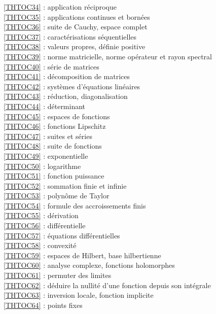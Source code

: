 \ref {THTOC34} : application réciproque\\
\ref {THTOC35} : applications continues et bornées\\
\ref {THTOC36} : suite de Cauchy, espace complet\\
\ref {THTOC37} : caractérisations séquentielles\\
\ref {THTOC38} : valeurs propres, définie positive\\
\ref {THTOC39} : norme matricielle, norme opérateur et rayon spectral\\
\ref {THTOC40} : série de matrices\\
\ref {THTOC41} : décomposition de matrices\\
\ref {THTOC42} : systèmes d'équations linéaires\\
\ref {THTOC43} : réduction, diagonalisation\\
\ref {THTOC44} : déterminant\\
\ref {THTOC45} : espaces de fonctions\\
\ref {THTOC46} : fonctions Lipschitz\\
\ref {THTOC47} : suites et séries\\
\ref {THTOC48} : suite de fonctions\\
\ref {THTOC49} : exponentielle\\
\ref {THTOC50} : logarithme\\
\ref {THTOC51} : fonction puissance\\
\ref {THTOC52} : sommation finie et infinie\\
\ref {THTOC53} : polynôme de Taylor\\
\ref {THTOC54} : formule des accroissements finis\\
\ref {THTOC55} : dérivation\\
\ref {THTOC56} : différentielle\\
\ref {THTOC57} : équations différentielles\\
\ref {THTOC58} : convexité\\
\ref {THTOC59} : espaces de Hilbert, base hilbertienne\\
\ref {THTOC60} : analyse complexe, fonctions holomorphes\\
\ref {THTOC61} : permuter des limites\\
\ref {THTOC62} : déduire la nullité d'une fonction depuis son intégrale\\
\ref {THTOC63} : inversion locale, fonction implicite\\
\ref {THTOC64} : points fixes\\
